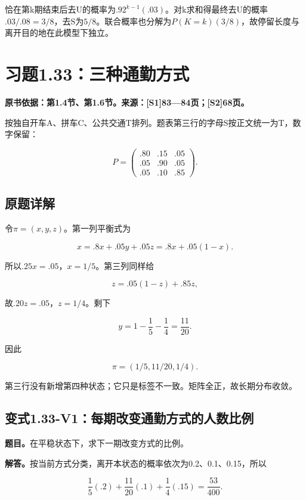 \documentclass[
  11pt,
  a4paper,
  UTF8,
  fontset=fandol]{ctexart}
\begin{document}
恰在第k期结束后去U的概率为\(.92^{k-1}(.03)\)。对k求和得最终去U的概率\(.03/.08=\boxed{3/8}\)，去S为\(5/8\)。联合概率也分解为\(P(K=k)(3/8)\)，故停留长度与离开目的地在此模型下独立。

\section{习题1.33：三种通勤方式}\label{ux4e60ux98981.33ux4e09ux79cdux901aux52e4ux65b9ux5f0f}

\textbf{原书依据：第1.4节、第1.6节。来源：{[}S1{]}83---84页；{[}S2{]}68页。}

按独自开车A、拼车C、公共交通T排列。题表第三行的字母S按正文统一为T，数字保留：

\[
P=\begin{pmatrix}.80&.15&.05\\.05&.90&.05\\.05&.10&.85\end{pmatrix}.
\]

\subsection{原题详解}\label{ux539fux9898ux8be6ux89e3-3}

令\(\pi=(x,y,z)\)。第一列平衡式为

\[
x=.8x+.05y+.05z=.8x+.05(1-x).
\]

所以\(.25x=.05\)，\(x=1/5\)。第三列同样给

\[
z=.05(1-z)+.85z,
\]

故\(.20z=.05\)，\(z=1/4\)。剩下

\[
y=1-\frac15-\frac14=\frac{11}{20}.
\]

因此

\[
\boxed{\pi=(1/5,11/20,1/4).}
\]

第三行没有新增第四种状态；它只是标签不一致。矩阵全正，故长期分布收敛。

\subsection{变式1.33-V1：每期改变通勤方式的人数比例}\label{ux53d8ux5f0f1.33-v1ux6bcfux671fux6539ux53d8ux901aux52e4ux65b9ux5f0fux7684ux4ebaux6570ux6bd4ux4f8b}

\textbf{题目。}在平稳状态下，求下一期改变方式的比例。

\textbf{解答。}按当前方式分类，离开本状态的概率依次为0.2、0.1、0.15，所以

\[
\boxed{\frac15(.2)+\frac{11}{20}(.1)+\frac14(.15)=\frac{53}{400}.}
\]
\end{document}
